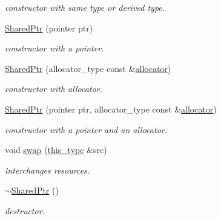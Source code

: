 \begin{DoxyCompactItemize}
\begin{DoxyCompactList}\small\item\em constructor with same type or derived type. \end{DoxyCompactList}\item 
\hypertarget{classhryky_1_1_shared_ptr_a7348d5624e30228d7f3477ae93e2cf68}{\hyperlink{classhryky_1_1_shared_ptr_a7348d5624e30228d7f3477ae93e2cf68}{Shared\-Ptr} (pointer ptr)}\label{classhryky_1_1_shared_ptr_a7348d5624e30228d7f3477ae93e2cf68}

\begin{DoxyCompactList}\small\item\em constructor with a pointer. \end{DoxyCompactList}\item 
\hypertarget{classhryky_1_1_shared_ptr_a6d3392ff4a95549180e6045797e7982c}{\hyperlink{classhryky_1_1_shared_ptr_a6d3392ff4a95549180e6045797e7982c}{Shared\-Ptr} (allocator\-\_\-type const \&\hyperlink{classhryky_1_1_shared_ptr_a6238460a4d882766f62458ad727f7bb4}{allocator})}\label{classhryky_1_1_shared_ptr_a6d3392ff4a95549180e6045797e7982c}

\begin{DoxyCompactList}\small\item\em constructor with allocator. \end{DoxyCompactList}\item 
\hypertarget{classhryky_1_1_shared_ptr_aa9c65a69a23f91e48be1e7e9c0c5cf74}{\hyperlink{classhryky_1_1_shared_ptr_aa9c65a69a23f91e48be1e7e9c0c5cf74}{Shared\-Ptr} (pointer ptr, allocator\-\_\-type const \&\hyperlink{classhryky_1_1_shared_ptr_a6238460a4d882766f62458ad727f7bb4}{allocator})}\label{classhryky_1_1_shared_ptr_aa9c65a69a23f91e48be1e7e9c0c5cf74}

\begin{DoxyCompactList}\small\item\em constructor with a pointer and an allocator. \end{DoxyCompactList}\item 
\hypertarget{classhryky_1_1_shared_ptr_a31ff2b6615bf4240b3ec8bcbcc06acc0}{void \hyperlink{classhryky_1_1_shared_ptr_a31ff2b6615bf4240b3ec8bcbcc06acc0}{swap} (\hyperlink{classhryky_1_1_shared_ptr_a0fa551b79990485506c88137044ec4b8}{this\-\_\-type} \&src)}\label{classhryky_1_1_shared_ptr_a31ff2b6615bf4240b3ec8bcbcc06acc0}

\begin{DoxyCompactList}\small\item\em interchanges resources. \end{DoxyCompactList}\item 
\hypertarget{classhryky_1_1_shared_ptr_a8a0abab882ae5fdee33fe7cac6b99780}{\hyperlink{classhryky_1_1_shared_ptr_a8a0abab882ae5fdee33fe7cac6b99780}{$\sim$\-Shared\-Ptr} ()}\label{classhryky_1_1_shared_ptr_a8a0abab882ae5fdee33fe7cac6b99780}

\begin{DoxyCompactList}\small\item\em destructor. \end{DoxyCompactList}\end{DoxyCompactItemize}
